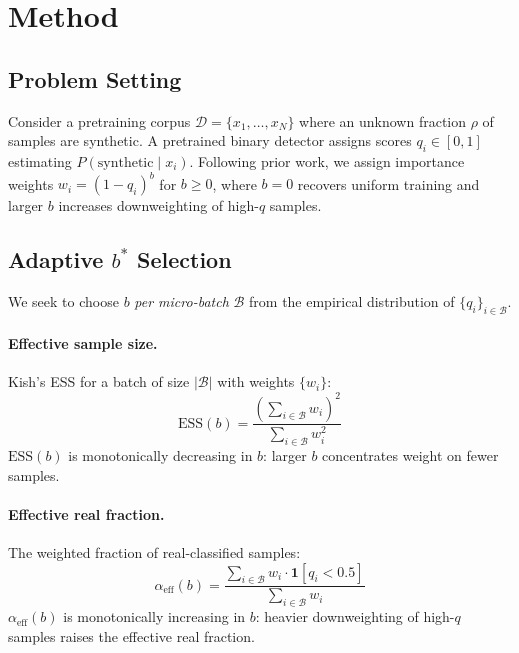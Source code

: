 \documentclass[11pt]{article}
\begin{document}
\section{Method}
\label{sec:method}

\subsection{Problem Setting}

Consider a pretraining corpus $\mathcal{D} = \{x_1, \ldots, x_N\}$ where an unknown fraction $\rho$ of samples are synthetic. A pretrained binary detector assigns scores $q_i \in [0,1]$ estimating $P(\text{synthetic} \mid x_i)$. Following prior work, we assign importance weights $w_i = (1 - q_i)^b$ for $b \geq 0$, where $b=0$ recovers uniform training and larger $b$ increases downweighting of high-$q$ samples.

\subsection{Adaptive $b^*$ Selection}

We seek to choose $b$ \emph{per micro-batch} $\mathcal{B}$ from the empirical distribution of $\{q_i\}_{i \in \mathcal{B}}$.

\paragraph{Effective sample size.} Kish's ESS for a batch of size $|\mathcal{B}|$ with weights $\{w_i\}$:
\begin{equation}
    \mathrm{ESS}(b) = \frac{\left(\sum_{i \in \mathcal{B}} w_i\right)^2}{\sum_{i \in \mathcal{B}} w_i^2}
\end{equation}
$\mathrm{ESS}(b)$ is monotonically decreasing in $b$: larger $b$ concentrates weight on fewer samples.

\paragraph{Effective real fraction.} The weighted fraction of real-classified samples:
\begin{equation}
    \alpha_{\mathrm{eff}}(b) = \frac{\sum_{i \in \mathcal{B}} w_i \cdot \mathbf{1}[q_i < 0.5]}{\sum_{i \in \mathcal{B}} w_i}
\end{equation}
$\alpha_{\mathrm{eff}}(b)$ is monotonically increasing in $b$: heavier downweighting of high-$q$ samples raises the effective real fraction.
\end{document}
